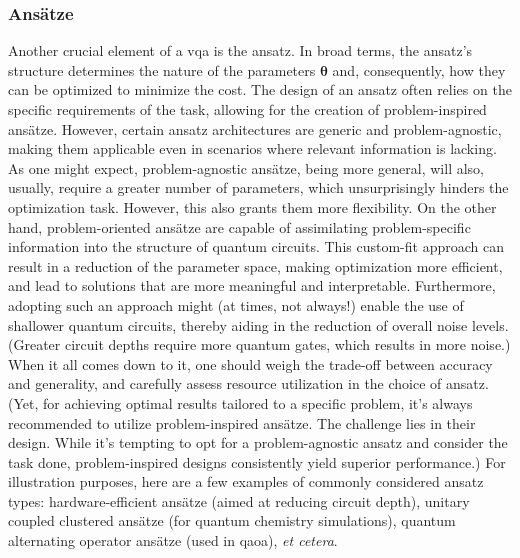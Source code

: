 \subsubsection*{\small Ansätze}
Another crucial element of a \acrshort{vqa} is the ansatz. In broad terms, the ansatz's structure determines the nature of the parameters $\boldsymbol{\theta}$ and, consequently, how they can be optimized to minimize the cost. The design of an ansatz often relies on the specific requirements of the task, allowing for the creation of problem-inspired ansätze. However, certain ansatz architectures are generic and problem-agnostic, making them applicable even in scenarios where relevant information is lacking. As one might expect, problem-agnostic ansätze, being more general, will also, usually, require a greater number of parameters, which unsurprisingly hinders the optimization task. However, this also grants them more flexibility. On the other hand, problem-oriented ansätze are capable of assimilating problem-specific information into the structure of quantum circuits. This custom-fit approach can result in a reduction of the parameter space, making optimization more efficient, and lead to solutions that are more meaningful and interpretable. Furthermore, adopting such an approach might (at times, not always!) enable the use of shallower quantum circuits, thereby aiding in the reduction of overall noise levels. (Greater circuit depths require more quantum gates, which results in more noise.) When it all comes down to it, one should weigh the trade-off between accuracy and generality, and carefully assess resource utilization in the choice of ansatz. (Yet, for achieving optimal results tailored to a specific problem, it's always recommended to utilize problem-inspired ansätze. The challenge lies in their design. While it's tempting to opt for a problem-agnostic ansatz and consider the task done, problem-inspired designs consistently yield superior performance.) For illustration purposes, here are a few examples of commonly considered ansatz types: hardware-efficient ansätze (aimed at reducing circuit depth), unitary coupled clustered ansätze (for quantum chemistry simulations), quantum alternating operator ansätze (used in \acrshort{qaoa}), \textit{et cetera}.

